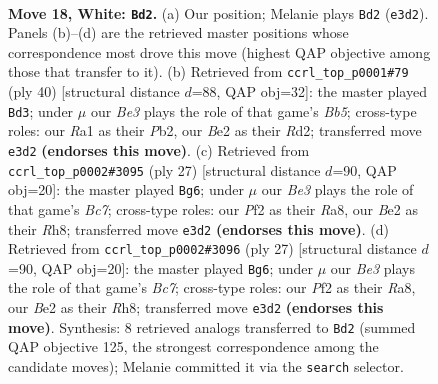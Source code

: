 \documentclass[11pt]{article}
\begin{document}
\clearpage

\begin{figure}[p]\centering
\begin{subfigure}{0.46\textwidth}\centering
\resizebox{\linewidth}{!}{%
\newchessgame
\chessboard[
  setfen={r1b3k1/ppppqppp/1b1n4/3P4/8/2N1B2P/PPP1BPP1/R3Q1K1 w - - 7 18},
  showmover=false,
  pgfstyle=straightmove, color=movearrow, markmove={e3-d2}
]}
\caption{}
\end{subfigure}\hfill
\begin{subfigure}{0.46\textwidth}\centering
\resizebox{\linewidth}{!}{%
\newchessgame
\chessboard[
  setfen={r4nk1/4bppp/pq2p3/1Bp5/4P3/Pb3NB1/1P1RQPPP/6K1 w - - 0 21},
  showmover=false,
  pgfstyle=straightmove, color=movearrow, markmove={b5-d3}
]}
\caption{}
\end{subfigure}
\\[4pt]
\begin{subfigure}{0.46\textwidth}\centering
\resizebox{\linewidth}{!}{%
\newchessgame
\chessboard[
  setfen={r2qk2r/ppp2ppp/1n1b4/3p4/3P1B2/2P1PQ2/PRbN1PPP/4KB1R b Kkq - 6 14},
  showmover=false,
  pgfstyle=straightmove, color=movearrow, markmove={c2-g6}
]}
\caption{}
\end{subfigure}\hfill
\begin{subfigure}{0.46\textwidth}\centering
\resizebox{\linewidth}{!}{%
\newchessgame
\chessboard[
  setfen={r2qk2r/ppp2ppp/1n1b4/3p4/3P1B2/2P1PQ2/PRbN1PPP/4KB1R b Kkq - 6 14},
  showmover=false,
  pgfstyle=straightmove, color=movearrow, markmove={c2-g6}
]}
\caption{}
\end{subfigure}
\caption{\textbf{Move 18, White: \texttt{Bd2}.} (a) Our position; Melanie plays \texttt{Bd2} (\texttt{e3d2}). Panels (b)--(d) are the retrieved master positions whose correspondence most drove this move (highest QAP objective among those that transfer to it). (b) Retrieved from \texttt{ccrl\_top\_p0001\#79} (ply 40) [structural distance $d$=88, QAP obj=32]: the master played \texttt{Bd3}; under $\mu$ our \emph{Be3} plays the role of that game's \emph{Bb5}; cross-type roles: our \emph{R}a1 as their \emph{P}b2, our \emph{B}e2 as their \emph{R}d2; transferred move \texttt{e3d2} \textbf{(endorses this move)}. (c) Retrieved from \texttt{ccrl\_top\_p0002\#3095} (ply 27) [structural distance $d$=90, QAP obj=20]: the master played \texttt{Bg6}; under $\mu$ our \emph{Be3} plays the role of that game's \emph{Bc7}; cross-type roles: our \emph{P}f2 as their \emph{R}a8, our \emph{B}e2 as their \emph{R}h8; transferred move \texttt{e3d2} \textbf{(endorses this move)}. (d) Retrieved from \texttt{ccrl\_top\_p0002\#3096} (ply 27) [structural distance $d$=90, QAP obj=20]: the master played \texttt{Bg6}; under $\mu$ our \emph{Be3} plays the role of that game's \emph{Bc7}; cross-type roles: our \emph{P}f2 as their \emph{R}a8, our \emph{B}e2 as their \emph{R}h8; transferred move \texttt{e3d2} \textbf{(endorses this move)}. Synthesis: 8 retrieved analogs transferred to \texttt{Bd2} (summed QAP objective 125, the strongest correspondence among the candidate moves); Melanie committed it via the \texttt{search} selector.}
\label{fig:thought-m34}
\end{figure}
\end{document}
